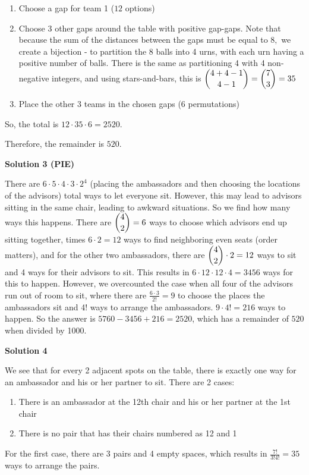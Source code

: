 \begin{enumerate}
 
            \begin{enumerate}
        \item Choose a gap for team 1 ($12$ options)
        \item Choose 3 other gaps around the table with positive gap-gaps. Note that because the sum of the distances between the gaps must be equal to $8,$ we create a bijection - to partition the 8 balls into 4 urns, with each urn having a positive number of balls.  There is the same as partitioning 4 with 4 non-negative integers, and using stars-and-bars, this is $\dbinom{4+4-1}{4-1}=\dbinom{7}{3}=35$
        \item Place the other 3 teams in the chosen gaps ($6$ permutations)
            \end{enumerate}
            So, the total is $12\cdot35\cdot6=2520$.

 Therefore, the remainder is $\boxed{520}$.

 



\textbf{Solution 3 (PIE)}

There are $6\cdot5\cdot4\cdot3\cdot2^4$ (placing the ambassadors and then choosing the locations of the advisors) total ways to let everyone sit. However, this may lead to advisors sitting in the same chair, leading to awkward situations. So we find how many ways this happens. There are $\dbinom{4}{2} = 6$ ways to choose which advisors end up sitting together, times $6\cdot2=12$ ways to find neighboring even seats (order matters), and for the other two ambassadors, there are $\dbinom{4}{2} \cdot 2 = 12$ ways to sit and 4 ways for their advisors to sit. This results in $6\cdot12\cdot12\cdot4=3456$ ways for this to happen. However, we overcounted the case when all four of the advisors run out of room to sit, where there are $\frac{6\cdot3}{2!}=9$ to choose the places the ambassadors sit and 4! ways to arrange the ambassadors. $9\cdot4!=216$ ways to happen. So the answer is $5760 - 3456 + 216 = 2520$, which has a remainder of $\boxed{520}$ when divided by 1000.

 



\textbf{Solution 4}

We see that for every 2 adjacent spots on the table, there is exactly one way for an ambassador and his or her partner to sit. There are 2 cases:

 
            \begin{enumerate}
        \item There is an ambassador at the 12th chair and his or her partner at the 1st chair
        \item There is no pair that has their chairs numbered as 12 and 1
            \end{enumerate}
            For the first case, there are 3 pairs and 4 empty spaces, which results in $\frac{7!}{3!4!} = 35$ ways to arrange the pairs.


\end{enumerate}

